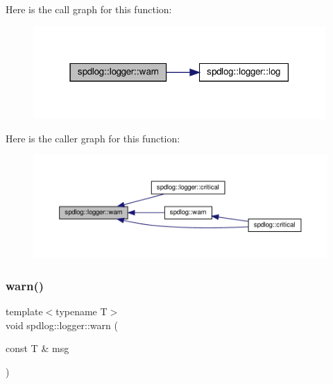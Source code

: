 Here is the call graph for this function\+:
\nopagebreak
\begin{figure}[H]
\begin{center}
\leavevmode
\includegraphics[width=316pt]{classspdlog_1_1logger_aa1027cf4e4d6fd7fcf361534affe7bdc_cgraph}
\end{center}
\end{figure}
Here is the caller graph for this function\+:
\nopagebreak
\begin{figure}[H]
\begin{center}
\leavevmode
\includegraphics[width=350pt]{classspdlog_1_1logger_aa1027cf4e4d6fd7fcf361534affe7bdc_icgraph}
\end{center}
\end{figure}
\mbox{\label{classspdlog_1_1logger_af9153fa3a0735a535ea56f684dc53256}} 
\subsubsection{\texorpdfstring{warn()}{warn()}\hspace{0.1cm}{\footnotesize\ttfamily [2/2]}}
{\footnotesize\ttfamily template$<$typename T$>$ \\
void spdlog\+::logger\+::warn (\begin{DoxyParamCaption}\item[{const T \&}]{msg }\end{DoxyParamCaption})\hspace{0.3cm}{\ttfamily [inline]}}



